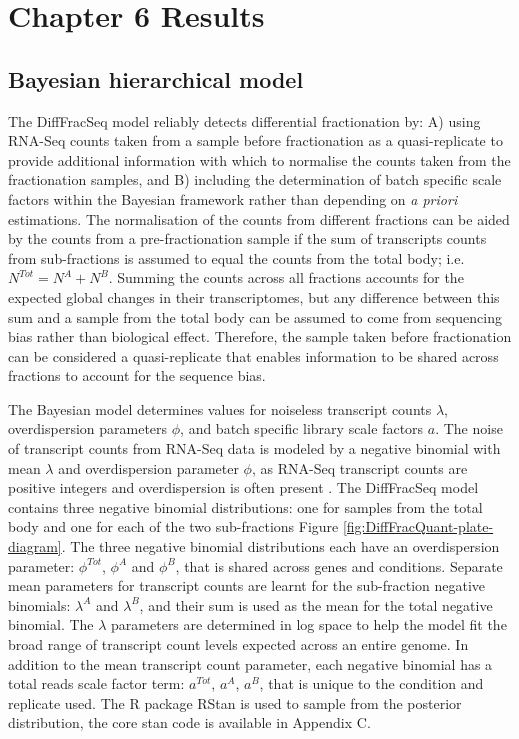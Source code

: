 \documentclass[../main.tex]{subfiles}
\begin{document}
\section{Chapter 6 Results}

\subsection{Bayesian hierarchical model}

The DiffFracSeq model reliably detects differential fractionation by: A) using RNA-Seq counts taken from a sample before fractionation as a quasi-replicate to provide additional information with which to normalise the counts taken from the fractionation samples, and B) including the determination of batch specific scale factors within the Bayesian framework rather than depending on \textit{a priori} estimations.
The normalisation of the counts from different fractions can be aided by the counts from a pre-fractionation sample if the sum of transcripts counts from sub-fractions is assumed to equal the counts from the total body; i.e. $N^{Tot} = N^{A}+N^{B}$.
Summing the counts across all fractions accounts for the expected global changes in their transcriptomes, but any difference between this sum and a sample from the total body can be assumed to come from sequencing bias rather than biological effect.
Therefore, the sample taken before fractionation can be considered a quasi-replicate that enables information to be shared across fractions to account for the sequence bias.

The Bayesian model determines values for noiseless transcript counts $\lambda$, overdispersion parameters $\phi$, and batch specific library scale factors $a$.
The noise of transcript counts from RNA-Seq data is modeled by a negative binomial with mean $\lambda$ and overdispersion parameter $\phi$, as RNA-Seq transcript counts are positive integers and overdispersion is often present \parencite{Robinson2007,Cameron1998}.
The DiffFracSeq model contains three negative binomial distributions: one for samples from the total body and one for each of the two sub-fractions Figure \ref{fig:DiffFracQuant-plate-diagram}.
The three negative binomial distributions each have an overdispersion parameter: $\phi^{Tot}$, $\phi^{A}$ and $\phi^{B}$, that is shared across genes and conditions.
Separate mean parameters for transcript counts are learnt for the sub-fraction negative binomials: $\lambda^A$ and $\lambda^B$, and their sum is used as the mean for the total negative binomial.
The $\lambda$ parameters are determined in log space to help the model fit the broad range of transcript count levels expected across an entire genome.
In addition to the mean transcript count parameter, each negative binomial has a total reads scale factor term: $a^{Tot}$, $a^{A}$, $a^{B}$, that is unique to the condition and replicate used.
The R package RStan is used to sample from the posterior distribution, the core stan code is available in Appendix C.
\end{document}
